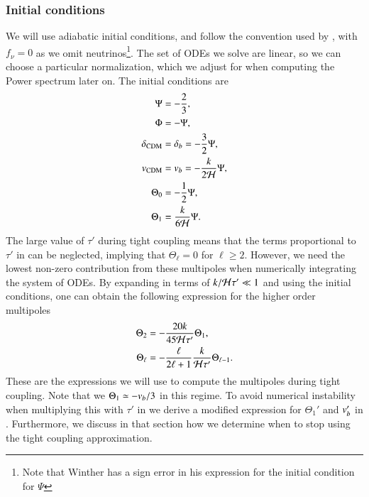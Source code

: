 \subsubsection{Initial conditions} \label{sssec:M3:theory:initial_conditions}
We will use adiabatic initial conditions, and follow the convention used by \cite{winther}, with $f_\nu=0$ as we omit neutrinos\footnote{Note that Winther has a sign error in his expression for the initial condition for $\Psi$}. The set of ODEs we solve are linear, so we can choose a particular normalization, which we adjust for when computing the Power spectrum later on. The initial conditions are      
\begin{subequations} \label{eq:M3:theory:pert_ODE_IC}
    \begin{align}
        \Psi &= -\frac{2}{3}, \label{eq:M3:theory:pert_ODE_IC_Psi} \\
        \Phi &= - \Psi, \label{eq:M3:theory:pert_ODE_IC_Phi} \\
        \delta_\mathrm{CDM} &= \delta_b = -\frac{3}{2}\Psi, \label{eq:M3:theory:pert_ODE_IC_delta_cdm} \\
        v_\mathrm{CDM} &= v_b = -\frac{k}{2\mathcal{H}} \Psi, \label{eq:M3:theory:pert_ODE_IC_v_cdm} \\
        \Theta_0 &= -\frac{1}{2}\Psi, \label{eq:M3:theory:pert_ODE_IC_Theta0} \\
        \Theta_1 &= \frac{k}{6\mathcal{H}}\Psi. \label{eq:M3:theory:pert_ODE_IC_Theta1} 
    \end{align}
\end{subequations}
The large value of $\tau'$ during tight coupling means that the terms proportional to $\tau'$ in  can be neglected, implying that $\Theta_\ell=0$ for $\ell\geq2$. However, we need the lowest non-zero contribution from these multipoles when numerically integrating the system of ODEs. By expanding in terms of $k/\mathcal{H}\tau'\ll1$ and using the initial conditions, one can obtain the following expression for the higher order multipoles
\begin{subequations} \label{eq:M3:theory:IC_Thetas}
    \begin{align}
        \Theta_2 &= - \frac{20k}{45\mathcal{H}\tau'}\Theta_1, \label{eq:M3:theory:IC_Theta2} \\
        \Theta_\ell &= - \frac{\ell}{2\ell+1} \frac{k}{\mathcal{H}\tau'}\Theta_{\ell-1} \label{eq:M3:theory:IC_Theta_ell}. 
    \end{align}
\end{subequations}
These are the expressions we will use to compute the multipoles during tight coupling. Note that we $\Theta_1\simeq-v_b/3$ in this regime. To avoid numerical instability when multiplying this with $\tau'$ in  we derive a modified expression for $\Theta_1'$ and $v_b'$ in . Furthermore, we discuss in that section how we determine when to stop using the tight coupling approximation. 


